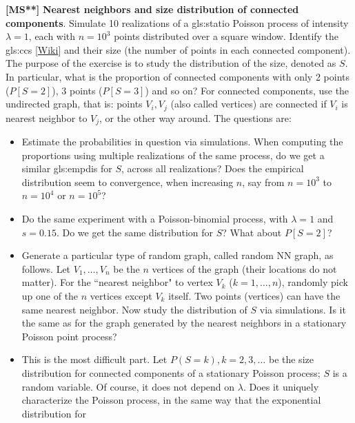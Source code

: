 \documentclass[10pt]{article}
\begin{document}
\begin{Exercise}\label{exercise14g}{\bf [MS**]} {\bf Nearest neighbors and size distribution of connected components}. Simulate
10 realizations of a \gls{gls:statio} Poisson process of intensity $\lambda=1$, each with $n=10^3$ points distributed over a square window. Identify the
\glspl{gls:cc}
 [\href{https://en.wikipedia.org/wiki/Component_(graph_theory)}{Wiki}]
and their size (the number of points in each connected component).
The purpose of the exercise is to study
the distribution of the size, denoted as $S$. In particular, what is the proportion of connected components with only 2 points ($P[S=2]$), 3 points
($P[S=3]$) and so on? For connected components,
use the
\textcolor{index}{undirected graph},
that is: points $V_i,V_j$ (also called vertices) are connected if $V_i$ is nearest neighbor to $V_j$, or the other way around.
The questions are:
\begin{itemize}
\item Estimate the probabilities in question via simulations. When computing the proportions using multiple realizations of the same process,
do we get a similar
 \gls{gls:empdis} for $S$, across all realizations? Does the empirical distribution seem to convergence, when  increasing $n$, say from $n=10^3$ to $n=10^4$ or $n=10^5$?
\item Do the same experiment with a Poisson-binomial process, with $\lambda=1$ and $s=0.15$. Do we get the same distribution for $S$? What
about $P[S=2]$?
\item Generate a particular type of
\textcolor{index}{random graph}, called \textcolor{index}{random NN graph}, as follows. Let $V_1,\dots,V_n$ be the $n$
\textcolor{index}{vertices} of the graph (their locations do not matter). For the ``nearest neighbor" to vertex $V_k$ ($k=1,\dots, n$), randomly pick up one of the $n$ vertices except $V_k$ itself. Two points (vertices) can have the same nearest neighbor.
Now study the distribution of $S$ via simulations. Is it the same as for the graph generated by the nearest neighbors in a stationary Poisson point process?
\item This is the most difficult part. Let $P(S=k), k=2,3,\dots$ be the size distribution for connected components of a stationary Poisson process; $S$ is a random variable. Of course, it does not depend on $\lambda$. Does it uniquely characterize the Poisson process, in the same way that the exponential distribution for

\end{itemize}
\end{Exercise}
\end{document}
